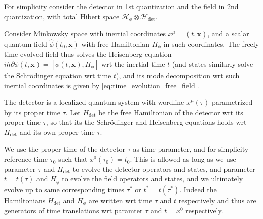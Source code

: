 \documentclass[../QFT_main.tex]{subfiles}
\begin{document}
\begin{mytheorem}
%
For simplicity consider the detector in 1st quantization and the field in 2nd quantization, with total Hibert space $\mathcal{H}_{\phi} \otimes \mathcal{H}_{\mathrm{det}}$.

Consider Minkowsky space with inertial coordinates $x^{\mu}=(t,\mathbf{x})$, and a scalar quantum field $\hat{\phi}(t_0,\mathbf{x})$ with free Hamiltonian $H_{\phi}$ in such coordinates.
The freely time-evolved field thus solves the Heisenberg equation $ih\partial \phi(t,\mathbf{x}) = [\phi(t,\mathbf{x}), H_{\phi}]$ wrt the inertial time $t$ (and states similarly solve the Schrödinger equation wrt time $t$), and its mode decomposition wrt such inertial coordinates is given by \eqref{eq:time_evolution_free_field}.

The detector is a localized quantum system with wordline $x^\mu(\tau)$ parametrized by its proper time $\tau$.
Let  $H_{\mathrm{det}}$ be the free Hamiltonian of the detector wrt its proper time $\tau$, so that its the Schrödinger and Heisenberg equations holds wrt $H_{\mathrm{det}}$ and its own proper time $\tau$. 

We use the proper time of the detector $\tau$ as time parameter, and for simplicity reference time $\tau_0$ such that $x^0(\tau_0)=t_0$.
This is allowed as long as we use parameter $\tau$ and $H_{\mathrm{det}}$ to evolve the detector operators and states, and parameter $t=t(\tau)$ and $H_{\phi}$ to evolve the field operators and states, and we ultimately evolve up to same corresponding times $\tau^*$ or $t^*=t(\tau^*)$.
Indeed the Hamiltonians $H_{\mathrm{det}}$ and $H_\phi$ are written wrt time $\tau$ and $t$ respectively and thus are generators of time translations wrt paramter $\tau$ and $t=x^0$ respectively.


\end{mytheorem}
\end{document}
